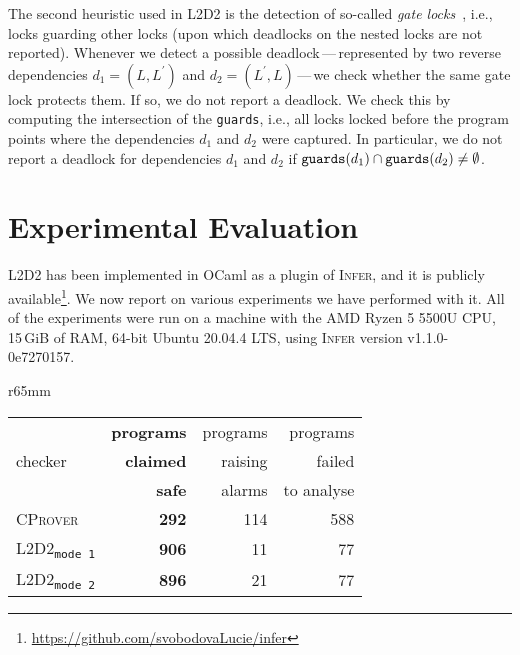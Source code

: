 \documentclass[runningheads]{llncs}
\newcommand{\LLDD}{\textsc{L2D2}\xspace} %
\newcommand{\Infer}{\textsc{Infer}\xspace}
\newcommand{\CProver}{\textsc{CProver}\xspace}
\newcommand{\mOne}{\texttt{mode\,1}\xspace}
\newcommand{\mTwo}{\texttt{mode\,2}\xspace}
\begin{document}
\enlargethispage{6mm}

The second heuristic used in \LLDD is the detection of so-called \emph{gate
locks}~\cite{goodlock00}, i.e., locks guarding other locks (upon which deadlocks
on the nested locks are not reported). Whenever we detect a possible
deadlock\,---\,represented by two reverse dependencies $d_1 = (L, L^\prime)$ and
$d_2 = (L^\prime, L)$\,---\,we check whether the same gate lock protects them.
If so, we do not report a deadlock. We check this by computing the intersection
of the \texttt{guards}, i.e., all locks locked before the program points where
the dependencies $d_1$ and $ d_2 $ were captured. In particular, we do not
report a deadlock for dependencies $d_1$ and $d_2$ if
$\text{\texttt{guards}}(d_1) \cap \text{\texttt{guards}}(d_2) \neq \emptyset$.

\vspace*{-4mm}\section{Experimental Evaluation}\vspace*{-2mm}
\label{sec:experiments}

\LLDD has been implemented in OCaml as a plugin of \Infer, and it is publicly
available\footnote{\url{https://github.com/svobodovaLucie/infer}}.
%
We now report on various experiments we have performed with it.
%
All of the experiments were run on a machine with the AMD Ryzen 5 5500U CPU,
15\,GiB of RAM, 64-bit Ubuntu 20.04.4 LTS, using \Infer version
v1.1.0-0e7270157.


\begin{wraptable}{r}{65mm}
    \begin{center}
        \vspace*{-14mm}
        \caption{Results of \LLDD and \CProver on non-deadlocking programs of
        the \CProver test-suite}
        \label{tab:resultsDebian}
        \vspace*{1mm}
        \begin{tabular}{l|r|r|r}
        & \textbf{programs} & programs & programs \\
        checker & \textbf{claimed} & raising & failed \\
        & \textbf{safe} & alarms & to analyse \\ \hline
        \textsc{\CProver}  & \textbf{292}   & 114   & 588 \\
        \textsc{\LLDD}\textsubscript{\mOne} & \textbf{906} & 11 & 77 \\
        \textsc{\LLDD}\textsubscript{\mTwo}  & \textbf{896} & 21 & 77
        \end{tabular}
    \end{center}
    \vspace*{-12mm}
\end{wraptable}
\end{document}
